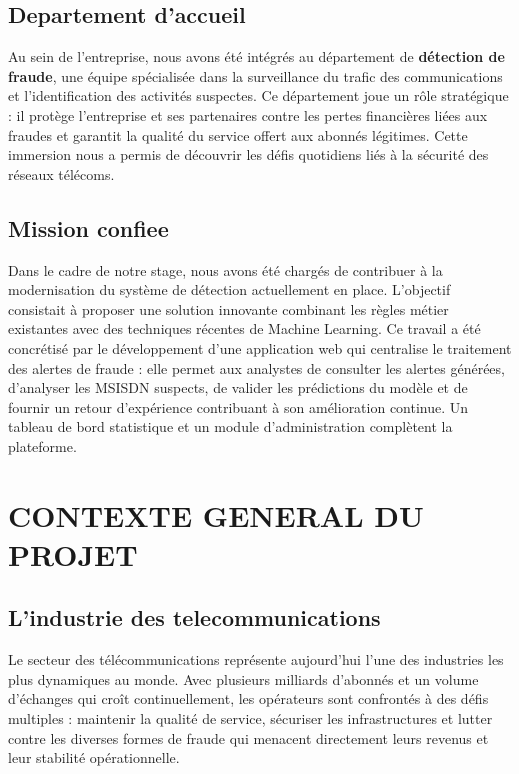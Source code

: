 \documentclass[12pt, oneside, a4paper]{report}
\begin{document}
\subsection{Departement d'accueil}
Au sein de l’entreprise, nous avons été intégrés au département de \textbf{ détection de fraude}, une équipe spécialisée dans la surveillance du trafic des communications et l’identification des activités suspectes. Ce département joue un rôle stratégique : il protège l’entreprise et ses partenaires contre les pertes financières liées aux fraudes et garantit la qualité du service offert aux abonnés légitimes. Cette immersion nous a permis de découvrir les défis quotidiens liés à la sécurité des réseaux télécoms.

\subsection{Mission confiee}
Dans le cadre de notre stage, nous avons été chargés de contribuer à la modernisation du système de détection actuellement en place. L'objectif consistait à proposer une solution innovante combinant les règles métier existantes avec des techniques récentes de Machine Learning. Ce travail a été concrétisé par le développement d'une application web qui centralise le traitement des alertes de fraude : elle permet aux analystes de consulter les alertes générées, d'analyser les MSISDN suspects, de valider les prédictions du modèle et de fournir un retour d'expérience contribuant à son amélioration continue. Un tableau de bord statistique et un module d'administration complètent la plateforme.

\section{CONTEXTE GENERAL DU PROJET}

\subsection{L'industrie des telecommunications}

Le secteur des télécommunications représente aujourd’hui l’une des industries les plus dynamiques au monde. Avec plusieurs milliards d’abonnés et un volume d’échanges qui croît continuellement, les opérateurs sont confrontés à des défis multiples : maintenir la qualité de service, sécuriser les infrastructures et lutter contre les diverses formes de fraude qui menacent directement leurs revenus et leur stabilité opérationnelle.
\end{document}
